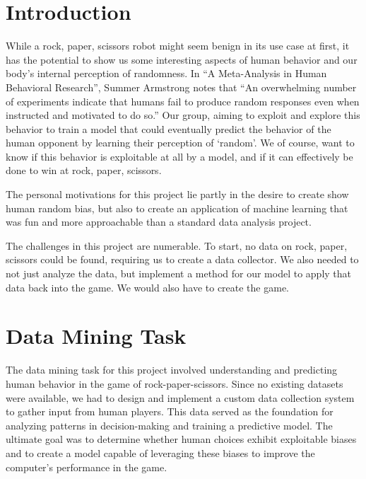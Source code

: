 

\section{Introduction}

While a rock, paper, scissors robot might seem benign in its use case at first,
it has the potential to show us some interesting aspects of human behavior and
our body’s internal perception of randomness. In ``A Meta-Analysis in Human
Behavioral Research'', Summer Armstrong notes that ``An overwhelming number of
experiments indicate that humans fail to produce random responses even when
instructed and motivated to do so.'' Our group, aiming to exploit and explore
this behavior to train a model that could eventually predict the behavior of the
human opponent by learning their perception of `random'. We of course, want to
know if this behavior is exploitable at all by a model, and if it can
effectively be done to win at rock, paper, scissors. \cite{armstrong_meta-analysis_2004}

The personal motivations for this project lie partly in the desire to create
show human random bias, but also to create an application of machine learning
that was fun and more approachable than a standard data analysis project.

The challenges in this project are numerable. To start, no data on rock, paper,
scissors could be found, requiring us to create a data collector. We also needed
to not just analyze the data, but implement a method for our model to apply that
data back into the game. We would also have to create the game.



\section{Data Mining Task}


The data mining task for this project involved understanding and predicting
human behavior in the game of rock-paper-scissors. Since no existing datasets
were available, we had to design and implement a custom data collection system
to gather input from human players. This data served as the foundation for
analyzing patterns in decision-making and training a predictive model. The
ultimate goal was to determine whether human choices exhibit exploitable biases
and to create a model capable of leveraging these biases to improve the
computer's performance in the game.

